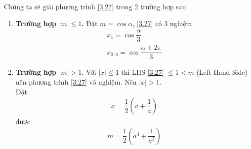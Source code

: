\documentclass[a4paper,oneside]{book}
\numberwithin{equation}{chapter}
\begin{document}
{Chúng ta sẽ giải phương trình \eqref{3.27} trong 2 trường hợp sau.
\begin{enumerate}
\item \textbf{Trường hợp $\left| m \right| \le 1$.} Đặt $m = \cos \alpha $, \eqref{3.27} có 3 nghiệm
\begin{align}
{x_1} = \cos \dfrac{\alpha }{3}\\
{x_{2,3}} = \cos \dfrac{{\alpha  \pm 2\pi }}{3}
\end{align}
\item \textbf{Trường hợp $\left| m \right| > 1$.} Với $\left| x \right| \le 1$ thì LHS \eqref{3.27} $\le 1 < m$ (Left Hand Side) nên phương trình \eqref{3.27} vô nghiệm. Nên $\left| x \right| > 1$.\\
Đặt 
\begin{align}
x = \dfrac{1}{2}\left( {a + \dfrac{1}{a}} \right)
\end{align}
được 
\begin{align}
m = \dfrac{1}{2}\left( {{a^3} + \dfrac{1}{{{a^3}}}} \right)
\end{align}


\end{enumerate}}
\end{document}
